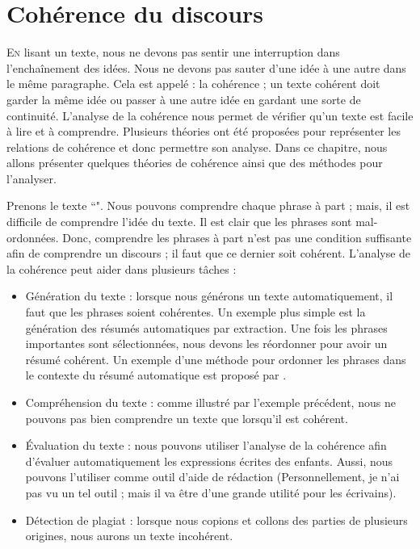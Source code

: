 \documentclass{KodeBook}
\begin{document}
		\mainmatter
	
\fi
\chapter{Cohérence du discours}

\begin{introduction}
	\lettrine{E}{n} lisant un texte, nous ne devons pas sentir une interruption dans l'enchaînement des idées.
	Nous ne devons pas sauter d'une idée à une autre dans le même paragraphe.
	Cela est appelé : la cohérence ; un texte cohérent doit garder la même idée ou passer à une autre idée en gardant une sorte de continuité.
	L'analyse de la cohérence nous permet de vérifier qu'un texte est facile à lire et à comprendre. 
	Plusieurs théories ont été proposées pour représenter les relations de cohérence et donc permettre son analyse.
	Dans ce chapitre, nous allons présenter quelques théories de cohérence ainsi que des méthodes pour l'analyser.
\end{introduction} 

Prenons le texte ``".
Nous pouvons comprendre chaque phrase à part ; mais, il est difficile de comprendre l'idée du texte. 
Il est clair que les phrases sont mal-ordonnées. 
Donc, comprendre les phrases à part n'est pas une condition suffisante afin de comprendre un discours ; il faut que ce dernier soit cohérent.
L'analyse de la cohérence peut aider dans plusieurs tâches :
\begin{itemize}
	\item Génération du texte : lorsque nous générons un texte automatiquement, il faut que les phrases soient cohérentes. 
	Un exemple plus simple est la génération des résumés automatiques par extraction. 
	Une fois les phrases importantes sont sélectionnées, nous devons les réordonner pour avoir un résumé cohérent. 
	Un exemple d'une méthode pour ordonner les phrases dans le contexte du résumé automatique est proposé par \citet{2019-oufaida-al}.
	\item Compréhension du texte : comme illustré par l'exemple précédent, nous ne pouvons pas bien comprendre un texte que lorsqu'il est cohérent.
	\item Évaluation du texte : nous pouvons utiliser l'analyse de la cohérence afin d'évaluer automatiquement les expressions écrites des enfants. 
	Aussi, nous pouvons l'utiliser comme outil d'aide de rédaction (Personnellement, je n'ai pas vu un tel outil ; mais il va être d'une grande utilité pour les écrivains).
	\item Détection de plagiat : lorsque nous copions et collons des parties de plusieurs origines, nous aurons un texte incohérent. 
\end{itemize}
\end{document}

